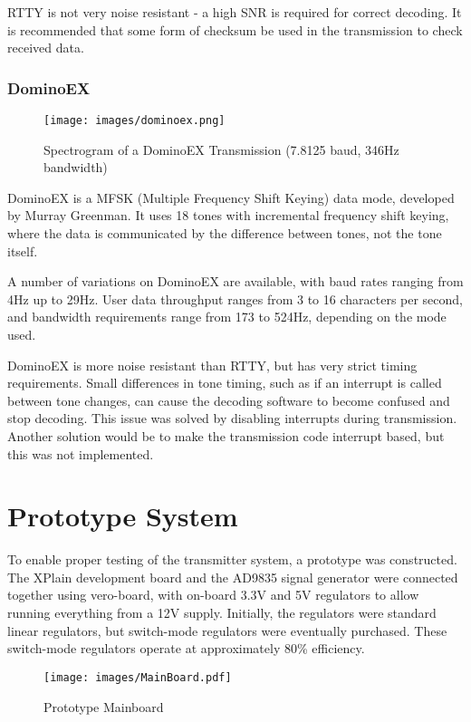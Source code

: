 \documentclass[a4paper,12pt]{article}
\begin{document}
RTTY is not very noise resistant - a high SNR is required for correct decoding. It is recommended that some form of checksum be used in the transmission to check received data.

\subsubsection*{DominoEX}
\begin{figure}[h]
  \begin{center}
    \texttt{[image: images/dominoex.png]}
  \end{center}
  \caption{Spectrogram of a DominoEX Transmission (7.8125 baud, 346Hz bandwidth)}
  \label{fig:dominoex}
\end{figure}
DominoEX is a MFSK (Multiple Frequency Shift Keying) data mode, developed by Murray Greenman\citep{ref:dominoex}. It uses 18 tones with incremental frequency shift keying, where the data is communicated by the difference between tones, not the tone itself.

A number of variations on DominoEX are available, with baud rates ranging from 4Hz up to 29Hz. User data throughput ranges from 3 to 16 characters per second, and bandwidth requirements range from 173 to 524Hz, depending on the mode used. 

DominoEX is more noise resistant than RTTY, but has very strict timing requirements. Small differences in tone timing, such as if an interrupt is called between tone changes, can cause the decoding software to become confused and stop decoding. This issue was solved by disabling interrupts during transmission. Another solution would be to make the transmission code interrupt based, but this was not implemented.

\section{Prototype System}
To enable proper testing of the transmitter system, a prototype was constructed. The XPlain development board and the AD9835 signal generator were connected together using vero-board, with on-board 3.3V and 5V regulators to allow running everything from a 12V supply. Initially, the regulators were standard linear regulators, but switch-mode regulators were eventually purchased. These switch-mode regulators operate at approximately 80\% efficiency.

\begin{figure}[h]
  \begin{center}
    \texttt{[image: images/MainBoard.pdf]}
  \end{center}
  \caption{Prototype Mainboard}
  \label{fig:mainboard}
\end{figure}
\end{document}
